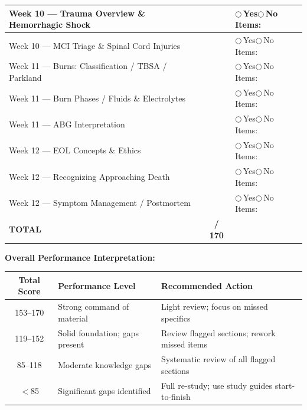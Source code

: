 \documentclass[11pt,letterpaper]{article}
\newcommand{\blank}[1][3cm]{\underline{\hspace{#1}}}
\begin{document}
\begin{gapbox}
\begin{center}
\begin{longtable}{|p{6cm}|c|p{5.5cm}|}
\hline
Week 10 --- Trauma Overview \& Hemorrhagic Shock & \blank[1cm] & $\bigcirc$\,Yes\quad$\bigcirc$\,No \newline Items: \blank[4.5cm] \\
\hline
Week 10 --- MCI Triage \& Spinal Cord Injuries & \blank[1cm] & $\bigcirc$\,Yes\quad$\bigcirc$\,No \newline Items: \blank[4.5cm] \\
\hline
Week 11 --- Burns: Classification / TBSA / Parkland & \blank[1cm] & $\bigcirc$\,Yes\quad$\bigcirc$\,No \newline Items: \blank[4.5cm] \\
\hline
Week 11 --- Burn Phases / Fluids \& Electrolytes & \blank[1cm] & $\bigcirc$\,Yes\quad$\bigcirc$\,No \newline Items: \blank[4.5cm] \\
\hline
Week 11 --- ABG Interpretation & \blank[1cm] & $\bigcirc$\,Yes\quad$\bigcirc$\,No \newline Items: \blank[4.5cm] \\
\hline
Week 12 --- EOL Concepts \& Ethics & \blank[1cm] & $\bigcirc$\,Yes\quad$\bigcirc$\,No \newline Items: \blank[4.5cm] \\
\hline
Week 12 --- Recognizing Approaching Death & \blank[1cm] & $\bigcirc$\,Yes\quad$\bigcirc$\,No \newline Items: \blank[4.5cm] \\
\hline
Week 12 --- Symptom Management / Postmortem & \blank[1cm] & $\bigcirc$\,Yes\quad$\bigcirc$\,No \newline Items: \blank[4.5cm] \\
\hline
\textbf{TOTAL} & \textbf{\blank[1cm] / 170} & \\
\hline
\end{longtable}
\end{center}

\vspace{0.4cm}

\textbf{Overall Performance Interpretation:}
\begin{center}
\renewcommand{\arraystretch}{1.4}
\begin{tabular}{|c|p{4.5cm}|p{7cm}|}
\hline
\textbf{Total Score} & \textbf{Performance Level} & \textbf{Recommended Action} \\
\hline
153--170 & Strong command of material & Light review; focus on missed specifics \\
\hline
119--152 & Solid foundation; gaps present & Review flagged sections; rework missed items \\
\hline
85--118  & Moderate knowledge gaps & Systematic review of all flagged sections \\
\hline
$<$85    & Significant gaps identified & Full re-study; use study guides start-to-finish \\
\hline
\end{tabular}
\end{center}


\end{gapbox}
\end{document}
